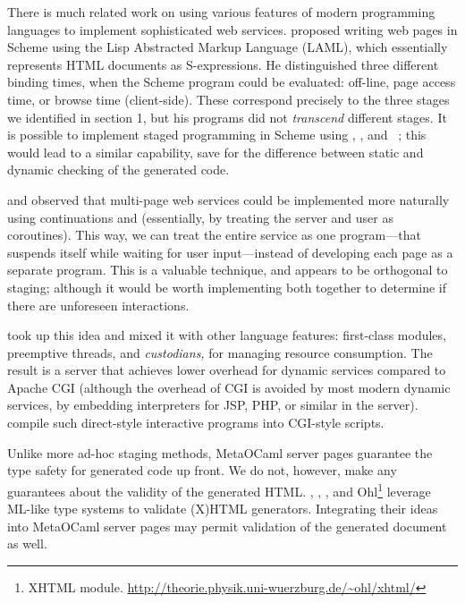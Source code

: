 \documentclass{elsart}
\def\MOC{MetaOCaml\xspace}
\begin{document}
There is much related work on using various features of modern
programming languages to implement sophisticated web services.
\citet{normark02programmatic} proposed writing web pages in Scheme
using the Lisp Abstracted Markup Language (LAML), which essentially
represents HTML documents as S-expressions.  He distinguished three
different binding times, when the Scheme program could be evaluated:
off-line, page access time, or browse time (client-side).  These
correspond precisely to the three stages we identified in section 1,
but his programs did not \emph{transcend} different stages.  It is
possible to implement staged programming in Scheme using
, , and ~\cite{davies01modal};
this would lead to a similar capability, save for the difference
between static and dynamic checking of the generated code.


\citet{queinnec00influence} and \citet{hughes00generalising} observed
that multi-page web services could be implemented more naturally using
continuations and  (essentially, by treating the server
and user as coroutines).  This way, we can treat the entire service as
one program---that suspends itself while waiting for user
input---instead of developing each page as a separate program.  This
is a valuable technique, and appears to be orthogonal to staging;
although it would be worth implementing both together to determine if
there are unforeseen interactions.

\citet{graunke01programming,graunke03modeling} took up this idea and
mixed it with other language features: first-class modules, preemptive
threads, and \emph{custodians,} for managing resource consumption.
The result is a server that achieves lower overhead for dynamic
services compared to Apache CGI (although the overhead of CGI is
avoided by most modern dynamic services, by embedding interpreters for
JSP, PHP, or similar in the server).  \citet{matthews04automatically}
compile such direct-style interactive programs into CGI-style scripts.


Unlike more ad-hoc staging methods, \MOC server pages guarantee the
type safety for generated code up front.  We do not, however, make any
guarantees about the validity of the generated HTML.
\citet{elsman04typing}, \citet{wallace99haxml}, \citet{hosoya03xduce},
and Ohl\footnote{XHTML module.
  \url{http://theorie.physik.uni-wuerzburg.de/~ohl/xhtml/}} 
leverage ML-like type systems to validate (X)HTML generators.
Integrating their ideas into \MOC server pages may permit validation
of the generated document as well.
\end{document}
